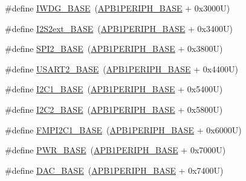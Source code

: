 \begin{DoxyCompactItemize}
\item 
\#define \hyperlink{group___peripheral__registers__structures_ga8543ee4997296af5536b007cd4748f55}{I\+W\+D\+G\+\_\+\+B\+A\+SE}~(\hyperlink{group___peripheral__memory__map_ga45666d911f39addd4c8c0a0ac3388cfb}{A\+P\+B1\+P\+E\+R\+I\+P\+H\+\_\+\+B\+A\+SE} + 0x3000\+U)
\item 
\#define \hyperlink{group___peripheral__registers__structures_gaa5f7b241ed5b756decd835300c9e7bc9}{I2\+S2ext\+\_\+\+B\+A\+SE}~(\hyperlink{group___peripheral__memory__map_ga45666d911f39addd4c8c0a0ac3388cfb}{A\+P\+B1\+P\+E\+R\+I\+P\+H\+\_\+\+B\+A\+SE} + 0x3400\+U)
\item 
\#define \hyperlink{group___peripheral__registers__structures_gac3e357b4c25106ed375fb1affab6bb86}{S\+P\+I2\+\_\+\+B\+A\+SE}~(\hyperlink{group___peripheral__memory__map_ga45666d911f39addd4c8c0a0ac3388cfb}{A\+P\+B1\+P\+E\+R\+I\+P\+H\+\_\+\+B\+A\+SE} + 0x3800\+U)
\item 
\#define \hyperlink{group___peripheral__registers__structures_gade83162a04bca0b15b39018a8e8ec090}{U\+S\+A\+R\+T2\+\_\+\+B\+A\+SE}~(\hyperlink{group___peripheral__memory__map_ga45666d911f39addd4c8c0a0ac3388cfb}{A\+P\+B1\+P\+E\+R\+I\+P\+H\+\_\+\+B\+A\+SE} + 0x4400\+U)
\item 
\#define \hyperlink{group___peripheral__registers__structures_gacd72dbffb1738ca87c838545c4eb85a3}{I2\+C1\+\_\+\+B\+A\+SE}~(\hyperlink{group___peripheral__memory__map_ga45666d911f39addd4c8c0a0ac3388cfb}{A\+P\+B1\+P\+E\+R\+I\+P\+H\+\_\+\+B\+A\+SE} + 0x5400\+U)
\item 
\#define \hyperlink{group___peripheral__registers__structures_ga04bda70f25c795fb79f163b633ad4a5d}{I2\+C2\+\_\+\+B\+A\+SE}~(\hyperlink{group___peripheral__memory__map_ga45666d911f39addd4c8c0a0ac3388cfb}{A\+P\+B1\+P\+E\+R\+I\+P\+H\+\_\+\+B\+A\+SE} + 0x5800\+U)
\item 
\#define \hyperlink{group___peripheral__registers__structures_gac6e36f905b89086de0fceda4325a9a8e}{F\+M\+P\+I2\+C1\+\_\+\+B\+A\+SE}~(\hyperlink{group___peripheral__memory__map_ga45666d911f39addd4c8c0a0ac3388cfb}{A\+P\+B1\+P\+E\+R\+I\+P\+H\+\_\+\+B\+A\+SE} + 0x6000\+U)
\item 
\#define \hyperlink{group___peripheral__registers__structures_gac691ec23dace8b7a649a25acb110217a}{P\+W\+R\+\_\+\+B\+A\+SE}~(\hyperlink{group___peripheral__memory__map_ga45666d911f39addd4c8c0a0ac3388cfb}{A\+P\+B1\+P\+E\+R\+I\+P\+H\+\_\+\+B\+A\+SE} + 0x7000\+U)
\item 
\#define \hyperlink{group___peripheral__registers__structures_gad18d0b914c7f68cecbee1a2d23a67d38}{D\+A\+C\+\_\+\+B\+A\+SE}~(\hyperlink{group___peripheral__memory__map_ga45666d911f39addd4c8c0a0ac3388cfb}{A\+P\+B1\+P\+E\+R\+I\+P\+H\+\_\+\+B\+A\+SE} + 0x7400\+U)

\end{DoxyCompactItemize}

